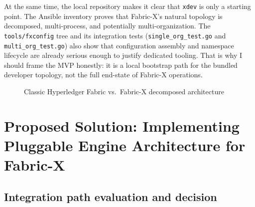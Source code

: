 At the same time, the local repository makes it clear that \texttt{xdev} is only a starting point. The Ansible inventory proves that Fabric-X's natural topology is decomposed, multi-process, and potentially multi-organization. The \texttt{tools/fxconfig} tree and its integration tests (\texttt{single\_org\_test.go} and \texttt{multi\_org\_test.go}) also show that configuration assembly and namespace lifecycle are already serious enough to justify dedicated tooling. That is why I should frame the MVP honestly: it is a local bootstrap path for the bundled developer topology, not the full end-state of Fabric-X operations.

\begin{figure}[h]
\centering
{}
\caption{Classic Hyperledger Fabric vs.\ Fabric-X decomposed architecture}
\label{fig:arch-comparison}
\end{figure}

\section{Proposed Solution: Implementing Pluggable Engine Architecture for Fabric-X}

\subsection{Integration path evaluation and decision}

